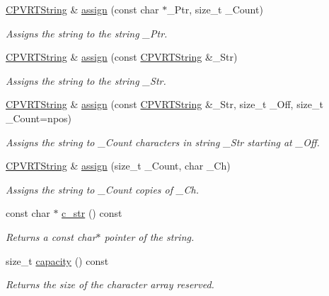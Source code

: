 \begin{DoxyCompactItemize}
\hyperlink{class_c_p_v_r_t_string}{C\+P\+V\+R\+T\+String} \& \hyperlink{class_c_p_v_r_t_string_aa43b84d7c6d6b5fcb0b380492d4074b5}{assign} (const char $\ast$\+\_\+\+Ptr, size\+\_\+t \+\_\+\+Count)
\begin{DoxyCompactList}\small\item\em Assigns the string to the string \+\_\+\+Ptr. \end{DoxyCompactList}\item 
\hyperlink{class_c_p_v_r_t_string}{C\+P\+V\+R\+T\+String} \& \hyperlink{class_c_p_v_r_t_string_a55d7d994a0577c852e88d054f317d8c2}{assign} (const \hyperlink{class_c_p_v_r_t_string}{C\+P\+V\+R\+T\+String} \&\+\_\+\+Str)
\begin{DoxyCompactList}\small\item\em Assigns the string to the string \+\_\+\+Str. \end{DoxyCompactList}\item 
\hyperlink{class_c_p_v_r_t_string}{C\+P\+V\+R\+T\+String} \& \hyperlink{class_c_p_v_r_t_string_a44936facbb11f935cbe4cf47a6ae3a75}{assign} (const \hyperlink{class_c_p_v_r_t_string}{C\+P\+V\+R\+T\+String} \&\+\_\+\+Str, size\+\_\+t \+\_\+\+Off, size\+\_\+t \+\_\+\+Count=npos)
\begin{DoxyCompactList}\small\item\em Assigns the string to \+\_\+\+Count characters in string \+\_\+\+Str starting at \+\_\+\+Off. \end{DoxyCompactList}\item 
\hyperlink{class_c_p_v_r_t_string}{C\+P\+V\+R\+T\+String} \& \hyperlink{class_c_p_v_r_t_string_a770dd6f3c9c45aa0c3a9013b95dc3d5f}{assign} (size\+\_\+t \+\_\+\+Count, char \+\_\+\+Ch)
\begin{DoxyCompactList}\small\item\em Assigns the string to \+\_\+\+Count copies of \+\_\+\+Ch. \end{DoxyCompactList}\item 
const char $\ast$ \hyperlink{class_c_p_v_r_t_string_aabd1f2848c4b1d65e7418b264502687d}{c\+\_\+str} () const 
\begin{DoxyCompactList}\small\item\em Returns a const char$\ast$ pointer of the string. \end{DoxyCompactList}\item 
size\+\_\+t \hyperlink{class_c_p_v_r_t_string_ad6c21b772c47aad0bb87a37fdd849d5b}{capacity} () const 
\begin{DoxyCompactList}\small\item\em Returns the size of the character array reserved. \end{DoxyCompactList}\item 

\end{DoxyCompactItemize}

